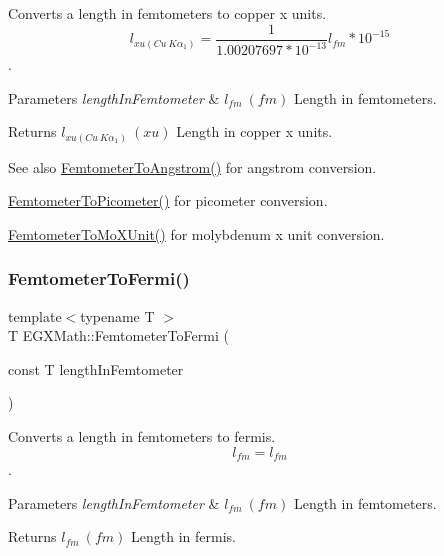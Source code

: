 Converts a length in femtometers to copper x units. \[ l_{xu(Cu\ K\alpha_1)}= \frac{1}{1.00207697*10^{-13}} l_{fm} * 10^{-15}\]. 


\begin{DoxyParams}{Parameters}
{\em length\+In\+Femtometer} & $ l_{fm}\ (fm)$ Length in femtometers. \\
\hline
\end{DoxyParams}
\begin{DoxyReturn}{Returns}
$ l_{xu(Cu\ K\alpha_1)}\ (xu)$ Length in copper x units. 
\end{DoxyReturn}
\begin{DoxySeeAlso}{See also}
\mbox{\hyperlink{group___e_g_x_math-_conversions-_length_conversions-_s_i-_femtometer-_non-_s_i_ga72862654ebe3812db0fbf8d11d7059ff}{Femtometer\+To\+Angstrom()}} for angstrom conversion. 

\mbox{\hyperlink{group___e_g_x_math-_conversions-_length_conversions-_s_i-_femtometer-_s_i_gadfcd6b374d4134cad0ac1ce7a8e50509}{Femtometer\+To\+Picometer()}} for picometer conversion. 

\mbox{\hyperlink{group___e_g_x_math-_conversions-_length_conversions-_s_i-_femtometer-_non-_s_i_ga57801d7c681362c1a11053233e31c415}{Femtometer\+To\+Mo\+X\+Unit()}} for molybdenum x unit conversion. 
\end{DoxySeeAlso}
\mbox{\label{group___e_g_x_math-_conversions-_length_conversions-_s_i-_femtometer-_non-_s_i_gaa2e838ef76ce47a3375291d76990b865}} 
\subsubsection{\texorpdfstring{Femtometer\+To\+Fermi()}{FemtometerToFermi()}}
{\footnotesize\ttfamily template$<$typename T $>$ \\
T E\+G\+X\+Math\+::\+Femtometer\+To\+Fermi (\begin{DoxyParamCaption}\item[{const T}]{length\+In\+Femtometer }\end{DoxyParamCaption})}



Converts a length in femtometers to fermis. \[ l_{fm}=l_{fm} \]. 


\begin{DoxyParams}{Parameters}
{\em length\+In\+Femtometer} & $ l_{fm}\ (fm)$ Length in femtometers. \\
\hline
\end{DoxyParams}
\begin{DoxyReturn}{Returns}
$ l_{fm}\ (fm)$ Length in fermis. 
\end{DoxyReturn}
\mbox{\label{group___e_g_x_math-_conversions-_length_conversions-_s_i-_femtometer-_non-_s_i_gac1a358bdb9bf33dec3cb847cafe1bc71}} 

